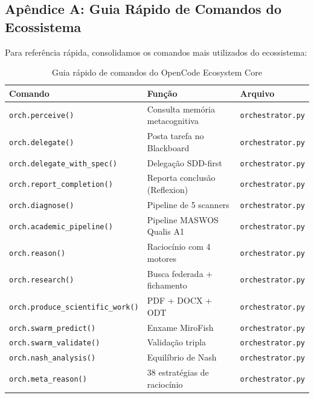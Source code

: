 
\subsection{Apêndice A: Guia Rápido de Comandos do Ecossistema}
\label{sec:apendice-comandos}

Para referência rápida, consolidamos os comandos mais utilizados do ecossistema:

\begin{table}[H]
\centering
\caption{Guia rápido de comandos do OpenCode Ecosystem Core}
\label{tab:quick-ref}
\begin{tabular}{@{}lp{6cm}p{5cm}@{}}
\toprule
\textbf{Comando} & \textbf{Função} & \textbf{Arquivo} \\
\midrule
\texttt{orch.perceive()} & Consulta memória metacognitiva & \texttt{orchestrator.py} \\
\texttt{orch.delegate()} & Posta tarefa no Blackboard & \texttt{orchestrator.py} \\
\texttt{orch.delegate\_with\_spec()} & Delegação SDD-first & \texttt{orchestrator.py} \\
\texttt{orch.report\_completion()} & Reporta conclusão (Reflexion) & \texttt{orchestrator.py} \\
\texttt{orch.diagnose()} & Pipeline de 5 scanners & \texttt{orchestrator.py} \\
\texttt{orch.academic\_pipeline()} & Pipeline MASWOS Qualis A1 & \texttt{orchestrator.py} \\
\texttt{orch.reason()} & Raciocínio com 4 motores & \texttt{orchestrator.py} \\
\texttt{orch.research()} & Busca federada + fichamento & \texttt{orchestrator.py} \\
\texttt{orch.produce\_scientific\_work()} & PDF + DOCX + ODT & \texttt{orchestrator.py} \\
\texttt{orch.swarm\_predict()} & Enxame MiroFish & \texttt{orchestrator.py} \\
\texttt{orch.swarm\_validate()} & Validação tripla & \texttt{orchestrator.py} \\
\texttt{orch.nash\_analysis()} & Equilíbrio de Nash & \texttt{orchestrator.py} \\
\texttt{orch.meta\_reason()} & 38 estratégias de raciocínio & \texttt{orchestrator.py} \\

\end{tabular}
\end{table}
